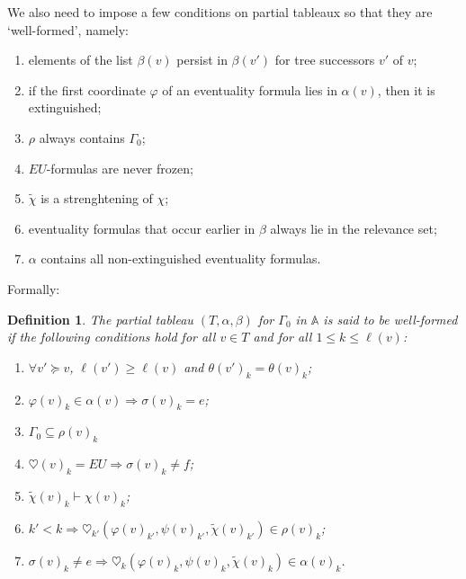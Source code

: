 \documentclass[11pt]{article}
\newcommand{\A}{{\mathbb A}}
\newtheorem{definition}{Definition}[section]
\begin{document}
We also need to impose a few conditions on partial tableaux so that they are `well-formed', namely:
\begin{enumerate}[label=(\alph*)]
    \setlength\itemsep{0em}
    \item elements of the list $\beta(v)$ persist in $\beta(v')$ for tree successors $v'$ of $v$;
    \item if the first coordinate $\varphi$ of an eventuality formula lies in $\alpha(v)$, then it is extinguished;
    \item $\rho$ always contains $\Gamma_0$; 
    \item $EU$-formulas are never frozen;
    \item $\tilde{\chi}$ is a strenghtening of $\chi$;
    \item eventuality formulas that occur earlier in $\beta$ always lie in the relevance set;
    \item $\alpha$ contains all non-extinguished eventuality formulas.
\end{enumerate}

Formally:
\begin{definition}\label{well_formed_partial_tableau}
    The partial tableau $(T,\alpha,\beta)$ for $\Gamma_0$ in $\A$ is said to be \emph{well-formed} if the following conditions hold for all $v\in T$ and for all $1\leq k\leq \ell(v)$:
    \begin{enumerate}[label=(\alph*)]
        \setlength\itemsep{0em}
        \item $\forall v'\succeq v$, $\ell(v')\geq\ell(v)$ and $\theta(v')_k = \theta(v)_k$;
        \item $\varphi(v)_k\in\alpha(v)\Rightarrow\sigma(v)_k=e$;
        \item $\Gamma_0\subseteq\rho(v)_k$
        \item $\heartsuit(v)_k=EU \Rightarrow \sigma(v)_k\not=f$;
        \item $\tilde{\chi}(v)_k\vdash\chi(v)_k$;
        \item $k'<k\Rightarrow\heartsuit_{k'}(\varphi(v)_{k'},\psi(v)_{k'},\tilde{\chi}(v)_{k'})\in\rho(v)_k$;
        \item $\sigma(v)_k\not=e\Rightarrow\heartsuit_{k}(\varphi(v)_{k},\psi(v)_{k},\tilde{\chi}(v)_{k})\in\alpha(v)_k$.
    \end{enumerate}
\end{definition}





\end{document}
